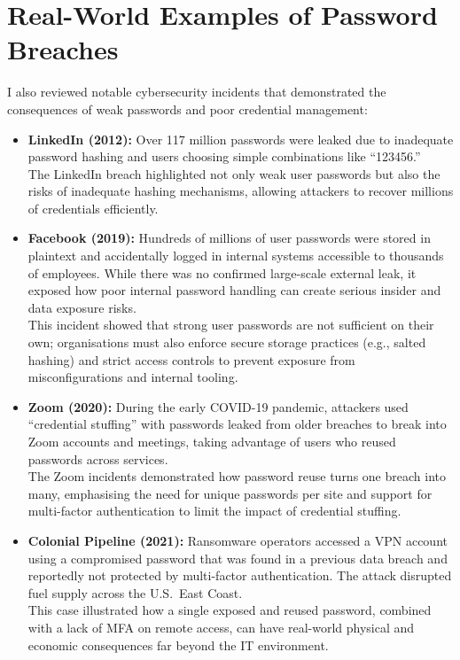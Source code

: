 \section{Real-World Examples of Password Breaches}

I also reviewed notable cybersecurity incidents that demonstrated the consequences of weak passwords and poor credential management:

\begin{itemize}
    \item \textbf{LinkedIn (2012):} Over 117 million passwords were leaked due to inadequate password hashing and users choosing simple combinations like ``123456.''\\
    The LinkedIn breach highlighted not only weak user passwords but also the risks of inadequate hashing mechanisms, allowing attackers to recover millions of credentials efficiently.

    \item \textbf{Facebook (2019):} Hundreds of millions of user passwords were stored in plaintext and accidentally logged in internal systems accessible to thousands of employees. While there was no confirmed large-scale external leak, it exposed how poor internal password handling can create serious insider and data exposure risks.\\
    This incident showed that strong user passwords are not sufficient on their own; organisations must also enforce secure storage practices (e.g., salted hashing) and strict access controls to prevent exposure from misconfigurations and internal tooling.

    \item \textbf{Zoom (2020):} During the early COVID-19 pandemic, attackers used ``credential stuffing'' with passwords leaked from older breaches to break into Zoom accounts and meetings, taking advantage of users who reused passwords across services.\\
    The Zoom incidents demonstrated how password reuse turns one breach into many, emphasising the need for unique passwords per site and support for multi-factor authentication to limit the impact of credential stuffing.

    \item \textbf{Colonial Pipeline (2021):} Ransomware operators accessed a VPN account using a compromised password that was found in a previous data breach and reportedly not protected by multi-factor authentication. The attack disrupted fuel supply across the U.S.\ East Coast.\\
    This case illustrated how a single exposed and reused password, combined with a lack of MFA on remote access, can have real-world physical and economic consequences far beyond the IT environment.


\end{itemize}
